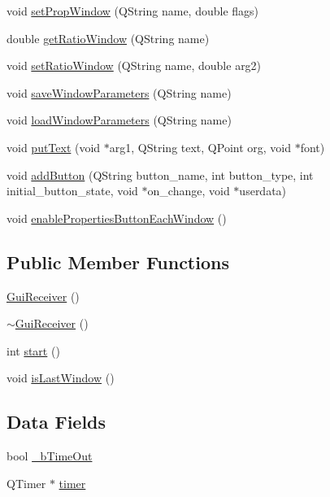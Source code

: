 \begin{DoxyCompactItemize}
\item 
void \hyperlink{classGuiReceiver_a2f7df93bb22ec310b8f9b44844662b85}{set\-Prop\-Window} (Q\-String name, double flags)
\item 
double \hyperlink{classGuiReceiver_aaf16c278a39a4ee6a02de8de5e348c5c}{get\-Ratio\-Window} (Q\-String name)
\item 
void \hyperlink{classGuiReceiver_a42057f63804bb4f378c9ecb9a77f140c}{set\-Ratio\-Window} (Q\-String name, double arg2)
\item 
void \hyperlink{classGuiReceiver_a0b4cb6c25ca109fdbcdc0538caf91da5}{save\-Window\-Parameters} (Q\-String name)
\item 
void \hyperlink{classGuiReceiver_afc852e63d8d8e4158984d37a444927ee}{load\-Window\-Parameters} (Q\-String name)
\item 
void \hyperlink{classGuiReceiver_a9d6fca288ed9086e22ad5d85ef0a3ae3}{put\-Text} (void $\ast$arg1, Q\-String text, Q\-Point org, void $\ast$font)
\item 
void \hyperlink{classGuiReceiver_aa1507b4023e4881e37c4b2a2ba0c2353}{add\-Button} (Q\-String button\-\_\-name, int button\-\_\-type, int initial\-\_\-button\-\_\-state, void $\ast$on\-\_\-change, void $\ast$userdata)
\item 
void \hyperlink{classGuiReceiver_ad4c4385d49e830263e996416e16d137a}{enable\-Properties\-Button\-Each\-Window} ()
\end{DoxyCompactItemize}
\subsection*{Public Member Functions}
\begin{DoxyCompactItemize}
\item 
\hyperlink{classGuiReceiver_a0f840f04f1834a394fceeeca7dd88827}{Gui\-Receiver} ()
\item 
\hyperlink{classGuiReceiver_a7655140d1defb2adb481eab40193fd97}{$\sim$\-Gui\-Receiver} ()
\item 
int \hyperlink{classGuiReceiver_a4f0ca1781d324a9b658b01034895e1ee}{start} ()
\item 
void \hyperlink{classGuiReceiver_a9f788023836b17e8aed97b3770386ea9}{is\-Last\-Window} ()
\end{DoxyCompactItemize}
\subsection*{Data Fields}
\begin{DoxyCompactItemize}
\item 
bool \hyperlink{classGuiReceiver_ad2d629b90a37e814db074e7ba1fc1aa9}{\-\_\-b\-Time\-Out}
\item 
Q\-Timer $\ast$ \hyperlink{classGuiReceiver_aeb64966586c4a35cfc02db46491afdf6}{timer}
\end{DoxyCompactItemize}


